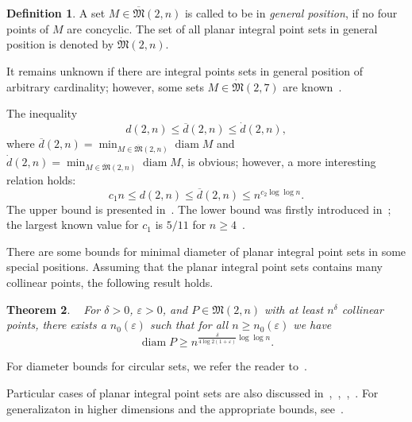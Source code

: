 \documentclass[a4paper,14pt]{article} %
\theoremstyle{plain}
\newtheorem{theorem}{Theorem}[section]
\theoremstyle{definition}
\newtheorem{definition}[theorem]{Definition}
\begin{document}
\begin{definition}
	A set $M\in\overline{\mathfrak{M}}(2,n)$ is called to be in \textit{general position},
	if no four points of $M$ are concyclic.
	The set of all planar integral point sets in general position
	is denoted by $\dot{\mathfrak{M}}(2,n)$.
\end{definition}

It remains unknown if there are integral points sets in general position of arbitrary cardinality;
however, some sets $M\in \dot{\mathfrak{M}}(2,7)$ are known~\cite{kreisel2008heptagon,kurz2013constructing}.

The inequality
\begin{equation*}
	d(2,n) \leq \overline{d}(2,n) \leq \dot{d}(2,n)
	,
\end{equation*}
where
$
	\overline{d}(2,n) = \min_{M\in\overline{\mathfrak{M}}(2,n)} \operatorname{diam} M
$
and
$
	\dot{d}(2,n) = \min_{M\in\dot{\mathfrak{M}}(2,n)} \operatorname{diam} M
$,
is obvious; however, a more interesting relation holds:
\begin{equation*}
	c_1 n \leq d(2,n) \leq \overline{d}(2,n) \leq n^{c_2 \log \log n}
	.
\end{equation*}
The upper bound is presented in~\cite{harborth1993upper}.
The lower bound was firstly introduced in~\cite{solymosi2003note};
the largest known value for $c_1$ is $5/11$ for $n\geq 4$~\cite{my-pps-linear-bound-2019}.


There are some bounds for minimal diameter of planar integral point sets in some special positions.
Assuming that the planar integral point sets contains many collinear points,
the following result holds.
\begin{theorem}~\cite[Theorem 4]{kurz2008minimum}
	For $\delta > 0$, $\varepsilon > 0$, and $P\in\mathfrak{M}(2,n)$ with
	at least $n^\delta$ collinear points, there exists a $n_0 (\varepsilon)$
	such that for all $n \geq n_0 (\varepsilon)$ we have
	\begin{equation}
		\operatorname{diam} P \geq n^{\frac{\delta}{4 \log 2(1+\varepsilon)}\log \log n}
		.
	\end{equation}
\end{theorem}
For diameter bounds for circular sets, we refer the reader to~\cite{bat2018number}.

Particular cases of planar integral point sets are also discussed
in~\cite[\S 5.11]{brass2006research},~\cite[\S D20]{guy2013unsolved},~\cite{our-pmm-2018},~\cite{our-ped-2018}.
For generalizaton in higher dimensions and the appropriate bounds, see~\cite{kurz2005characteristic,nozaki2013lower}.
\end{document}
